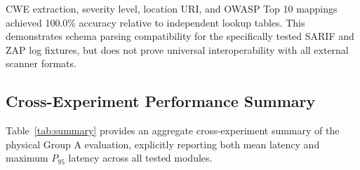 \documentclass[conference]{IEEEtran}
\begin{document}
\begin{table}[t]
\caption{Experiment 5 External Security Scanner Ingestion}
\label{tab:exp5}
\centering
{}
\end{table}

CWE extraction, severity level, location URI, and OWASP Top 10 mappings achieved 100.0\% accuracy relative to independent lookup tables. This demonstrates schema parsing compatibility for the specifically tested SARIF and ZAP log fixtures, but does not prove universal interoperability with all external scanner formats.

\subsection{Cross-Experiment Performance Summary}
Table~\ref{tab:summary} provides an aggregate cross-experiment summary of the physical Group A evaluation, explicitly reporting both mean latency and maximum $P_{95}$ latency across all tested modules.
\end{document}

